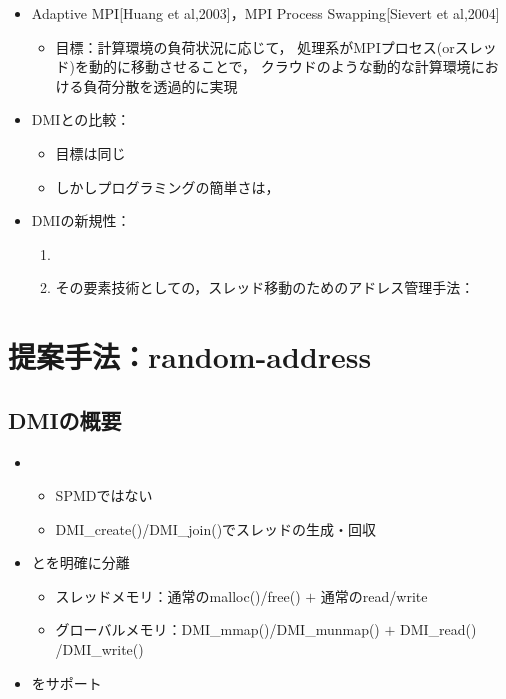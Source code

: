 \documentclass[25pt,papersize,landscape]{jsarticle}
\begin{document}
\begin{itemize}
\item Adaptive MPI{\scriptsize[Huang et al,2003]}，MPI Process Swapping{\scriptsize[Sievert et al,2004]}
  \begin{itemize}
  \item 目標：計算環境の負荷状況に応じて，
    処理系がMPIプロセス(orスレッド)を動的に移動させることで，
    クラウドのような動的な計算環境における負荷分散を透過的に実現
  \end{itemize}
\item DMIとの比較：
  \begin{itemize}
  \item 目標は同じ
  \item しかしプログラミングの簡単さは，
  \end{itemize}
\item DMIの新規性：
  \begin{enumerate}
  \item {}
  \item その要素技術としての，スレッド移動のためのアドレス管理手法：
  \end{enumerate}
\end{itemize}

\section{提案手法：random-address}

\subsection{DMIの概要}


\begin{itemize}
\item {}
  \begin{itemize}
  \item SPMDではない
  \item DMI\_create()/DMI\_join()でスレッドの生成・回収
  \end{itemize}
\item {}とを明確に分離
  \begin{itemize}
  \item スレッドメモリ：通常のmalloc()/free() $+$ 通常のread/write
  \item グローバルメモリ：DMI\_mmap()/DMI\_munmap() $+$ 
    DMI\_read()\\/DMI\_write()
  \end{itemize}
\item {}をサポート
\end{itemize}
\end{document}

